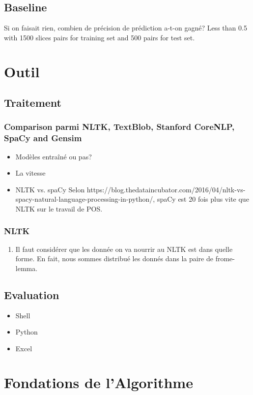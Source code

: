 \documentclass[a4paper]{article}
\begin{document}
\subsection{Baseline}
Si on faisait rien, combien de précision de prédiction a-t-on gagné? 
Less than 0.5 with 1500 slices pairs for training set and 500 pairs for test set.

\section{Outil}
\subsection{Traitement}
\subsubsection{Comparison parmi NLTK, TextBlob, Stanford CoreNLP, SpaCy and Gensim}
\begin{itemize}
\item Modèles entraîné ou pas?
\item La vitesse
\item NLTK vs. spaCy \cite{noauthor_nltk_2016} Selon https://blog.thedataincubator.com/2016/04/nltk-vs-spacy-natural-language-processing-in-python/, spaCy est 20 fois plus vite que NLTK sur le travail de POS.
\end{itemize}
\subsubsection{NLTK}
\begin{enumerate}
\item Il faut considérer que les donnée on va nourrir au NLTK est dans quelle forme. En fait, nous sommes distribué les donnés dans la paire de frome-lemma.
\end{enumerate}

\subsection{Evaluation}
\begin{itemize}
\item Shell
\item Python
\item Excel
\end{itemize}

\section{Fondations de l’Algorithme}
\end{document}
